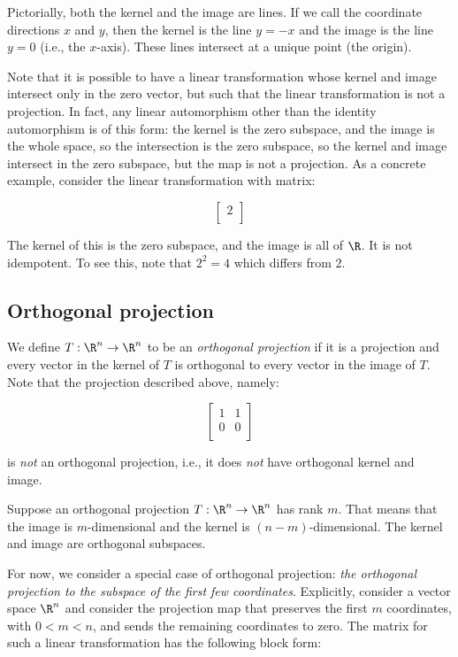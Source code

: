 \documentclass[10pt]{amsart}
\begin{document}
Pictorially, both the kernel and the image are lines. If we call the
coordinate directions $x$ and $y$, then the kernel is the line $y =
-x$ and the image is the line $y = 0$ (i.e., the $x$-axis). These
lines intersect at a unique point (the origin).

Note that it is possible to have a linear transformation whose kernel
and image intersect only in the zero vector, but such that the linear
transformation is not a projection. In fact, any linear automorphism
other than the identity automorphism is of this form: the kernel is
the zero subspace, and the image is the whole space, so the
intersection is the zero subspace, so the kernel and image intersect
in the zero subspace, but the map is not a projection. As a concrete
example, consider the linear transformation with matrix:

$$\left[ \begin{matrix} 2 \\\end{matrix}\right]$$

The kernel of this is the zero subspace, and the image is all of
$\R$. It is not idempotent. To see this, note that $2^2 = 4$ which
differs from $2$.

\subsection{Orthogonal projection}

We define $T:\R^n \to \R^n$ to be an {\em orthogonal projection} if it
is a projection and every vector in the kernel of $T$ is orthogonal to
every vector in the image of $T$. Note that the projection described
above, namely:

$$\left[\begin{matrix} 1 & 1 \\ 0 & 0 \\\end{matrix}\right]$$

is {\em not} an orthogonal projection, i.e., it does {\em not} have
orthogonal kernel and image.

Suppose an orthogonal projection $T:\R^n \to \R^n$ has rank $m$. That
means that the image is $m$-dimensional and the kernel is $(n -
m)$-dimensional. The kernel and image are orthogonal subspaces.

For now, we consider a special case of orthogonal projection: {\em the
  orthogonal projection to the subspace of the first few
  coordinates}. Explicitly, consider a vector space $\R^n$ and
consider the projection map that preserves the first $m$ coordinates,
with $0 < m < n$, and sends the remaining coordinates to zero. The
matrix for such a linear transformation has the following block form:
\end{document}
